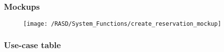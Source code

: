 \subsubsection{Mockups}
\begin{figure}[!ht]
  \centering
  \vspace{0.1cm}
  \texttt{[image: /RASD/System\_Functions/create\_reservation\_mockup]}\\
  \vspace{0.4cm}
  \label{fig:create_reservation_mockup} 
\end{figure}


\subsubsection{Use-case table}
